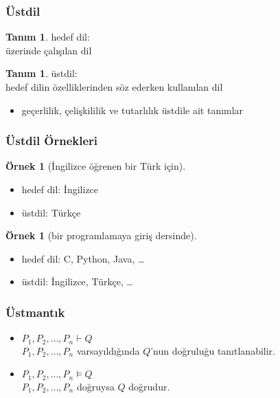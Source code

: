 \documentclass[dvipsnames]{beamer}
\theoremstyle{definition}
\newtheorem{tanim}[theorem]{Tanım}
\theoremstyle{example}
\newtheorem{ornek}[theorem]{Örnek}
\theoremstyle{plain}
\begin{document}
\begin{frame}
  \frametitle{Üstdil}

  \begin{tanim}
    \alert{hedef dil}:\\
      üzerinde çalışılan dil
  \end{tanim}

  \pause
  \begin{tanim}
    \alert{üstdil}:\\
      hedef dilin özelliklerinden söz ederken kullanılan dil
  \end{tanim}

  \pause
  \begin{itemize}
    \item geçerlilik, çelişkililik ve tutarlılık üstdile ait tanımlar
  \end{itemize}
\end{frame}

\begin{frame}
  \frametitle{Üstdil Örnekleri}

  \begin{ornek}[İngilizce öğrenen bir Türk için]
    \begin{itemize}
      \item hedef dil: İngilizce
      \item üstdil: Türkçe
    \end{itemize}
  \end{ornek}

  \pause
  \begin{ornek}[bir programlamaya giriş dersinde]
    \begin{itemize}
      \item hedef dil: C, Python, Java, \ldots
      \item üstdil: İngilizce, Türkçe, \ldots
    \end{itemize}
  \end{ornek}
\end{frame}

\begin{frame}
  \frametitle{Üstmantık}

  \begin{itemize}
    \item $P_1,P_2,\dots,P_n \vdash Q$\\
      $P_1,P_2,\dots,P_n$ varsayıldığında $Q$'nun doğruluğu tanıtlanabilir.

    \pause
    \medskip
    \item $P_1,P_2,\dots,P_n \vDash Q$\\
      $P_1,P_2,\dots,P_n$ doğruysa $Q$ doğrudur.
  \end{itemize}
\end{frame}
\end{document}

